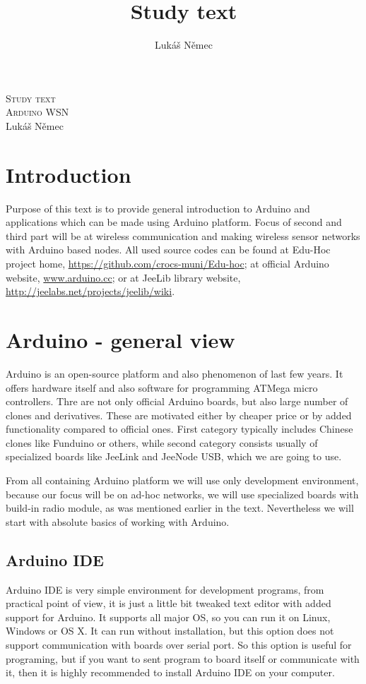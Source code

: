 \documentclass[12pt,titlepage]{article}
\title{Study text}
\author{Lukáš Němec}
\begin{document}
\begin{titlepage}
\begin{center}
\textsc{\LARGE Study text}\\[1cm]
\textsc{\Large Arduino WSN}\\[0.6cm]


\Large{Lukáš Němec}\\[1cm]

\bigskip
\bigskip

\end{center}
\end{titlepage}



\tableofcontents
\newpage
\section{Introduction}

Purpose of this text is to provide general introduction to Arduino and applications which can be made using Arduino platform. Focus of second and third part will be at wireless communication and making wireless sensor networks with Arduino based nodes. All used source codes can be found at Edu-Hoc project home, \url{https://github.com/crocs-muni/Edu-hoc}; at official Arduino website, \url{www.arduino.cc}; or at JeeLib library website, \url{http://jeelabs.net/projects/jeelib/wiki}.

\section{Arduino - general view}
Arduino is an open-source platform and also phenomenon of last few years. It offers hardware itself and also software for programming ATMega micro controllers. Thre are not only official Arduino boards, but also large number of clones and derivatives. These are motivated either by cheaper price or by added functionality compared to official ones. First category  typically includes Chinese clones like Funduino or others, while second category consists usually of specialized boards like JeeLink and JeeNode USB, which we are going to use.

From all containing Arduino platform we will use only development environment, because our focus will be on ad-hoc networks, we will use specialized boards with build-in radio module, as was mentioned earlier in the text. Nevertheless we will start with absolute basics of working with Arduino.

	\subsection{Arduino IDE}
	Arduino IDE is very simple environment for development programs, from practical point of view, it is just a little bit tweaked text editor with added support for Arduino.
	It supports all major OS, so you can run it on Linux, Windows or OS X. It can run without installation, but this option does not support communication with boards over serial port. So this option is useful for programing, but if you want to sent program to board itself or communicate with it, then it is highly recommended to install Arduino IDE on your computer.
\end{document}

